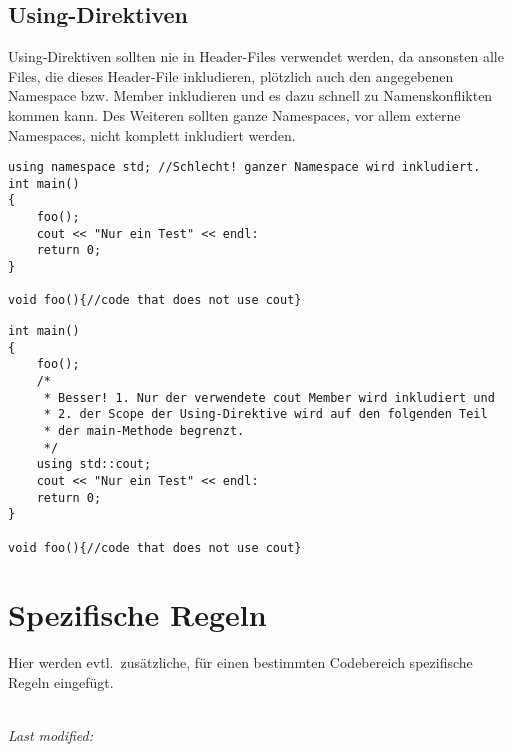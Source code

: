 \documentclass[12pt]{article}
\begin{document}
\subsection{Using-Direktiven}
Using-Direktiven sollten nie in Header-Files verwendet werden, da ansonsten alle Files, die dieses Header-File inkludieren, plötzlich auch den angegebenen Namespace bzw. Member inkludieren und es dazu schnell zu Namenskonflikten kommen kann.
Des Weiteren sollten ganze Namespaces, vor allem externe Namespaces, nicht komplett inkludiert werden.
\begin{lstlisting}
using namespace std; //Schlecht! ganzer Namespace wird inkludiert.
int main()
{
	foo();
	cout << "Nur ein Test" << endl:
	return 0;
}

void foo(){//code that does not use cout}
\end{lstlisting}
\begin{lstlisting}
int main()
{
	foo();
	/* 
	 * Besser! 1. Nur der verwendete cout Member wird inkludiert und
	 * 2. der Scope der Using-Direktive wird auf den folgenden Teil 
	 * der main-Methode begrenzt.
	 */
	using std::cout; 
	cout << "Nur ein Test" << endl:
	return 0;
}

void foo(){//code that does not use cout}

\end{lstlisting}

\section{Spezifische Regeln}
Hier werden evtl.\ zusätzliche, für einen bestimmten Codebereich spezifische Regeln eingefügt.\\
\\
\begin{center}
\emph{Last modified: \filemodprintdate{\jobname}}
\end{center}
\end{document}
